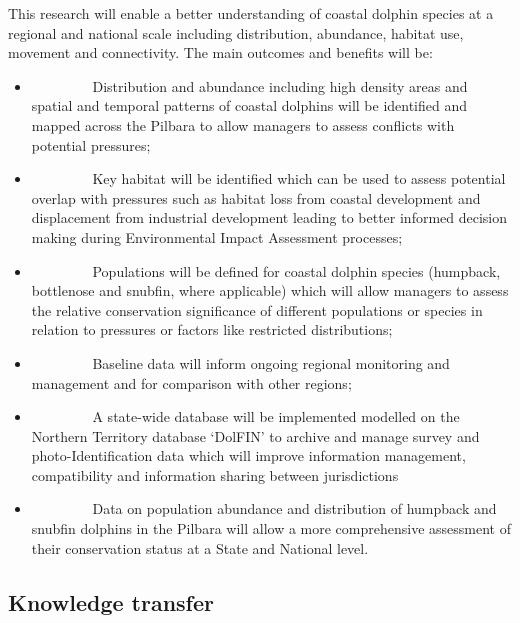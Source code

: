 \documentclass[version=last,
    paper=a4,                               %
    10pt,                                   %
    dvipsnames,
    oneside,                              %
    headings=openany,                       %
    open=any,
    BCOR=7mm,                               %
    DIV=15,     %
]{scrbook}
\providecommand{\tightlist}{\setlength{\itemsep}{0pt}\setlength{\parskip}{0pt}}
\begin{document}
This research will enable a better understanding of coastal dolphin
species at a regional and national scale including distribution,
abundance, habitat use, movement and connectivity. The main outcomes and
benefits will be:

\begin{itemize}
\tightlist
\item
  ~~~~~~~~ Distribution and abundance including high density areas and
  spatial and temporal patterns of coastal dolphins will be identified
  and mapped across the Pilbara to allow managers to assess conflicts
  with potential pressures;
\item
  ~~~~~~~~ Key habitat will be identified which can be used to assess
  potential overlap with pressures such as habitat loss from coastal
  development and displacement from industrial development leading to
  better informed decision making during Environmental Impact Assessment
  processes;
\item
  ~~~~~~~~ Populations will be defined for coastal dolphin species
  (humpback, bottlenose and snubfin, where applicable) which will allow
  managers to assess the relative conservation significance of different
  populations or species in relation to pressures or factors like
  restricted distributions;
\item
  ~~~~~~~~ Baseline data will inform ongoing regional monitoring and
  management and for comparison with other regions;
\item
  ~~~~~~~~ A state-wide database will be implemented modelled on the
  Northern Territory database `DolFIN' to archive and manage survey and
  photo-Identification data which will improve information management,
  compatibility and information sharing between jurisdictions
\item
  ~~~~~~~~ Data on population abundance and distribution of humpback and
  snubfin dolphins in the Pilbara will allow a more comprehensive
  assessment of their conservation status at a State and National level.
\end{itemize}




\subsection*{Knowledge transfer}
\end{document}
